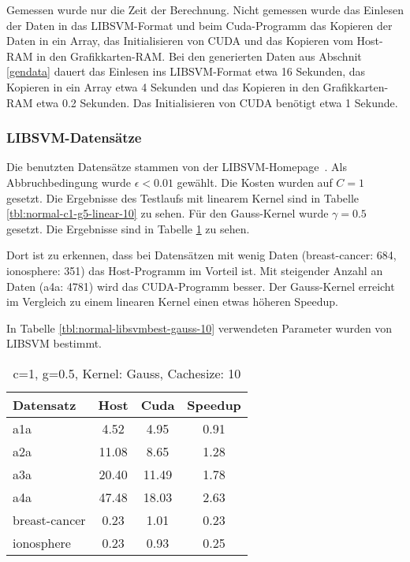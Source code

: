 \documentclass[ngerman]{scrartcl}
\begin{document}
Gemessen wurde nur die Zeit der Berechnung.
Nicht gemessen wurde das Einlesen der Daten in das LIBSVM-Format und beim Cuda-Programm das Kopieren der Daten 
in ein Array, das Initialisieren von CUDA und das Kopieren vom Host-RAM in den Grafikkarten-RAM.
Bei den generierten Daten aus Abschnit \ref{gendata} dauert das Einlesen ins LIBSVM-Format etwa 16 Sekunden, das Kopieren in ein Array
etwa 4 Sekunden und das Kopieren in den Grafikkarten-RAM etwa 0.2 Sekunden. Das Initialisieren von CUDA benötigt etwa 1 Sekunde.


\subsubsection{LIBSVM-Datensätze}
Die benutzten Datensätze stammen von der LIBSVM-Homepage~\cite{libsvm-data}. Als Abbruchbedingung wurde $\epsilon < 0.01$ gewählt. Die Kosten wurden auf $C=1$ gesetzt. Die Ergebnisse des Testlaufs mit linearem Kernel sind in Tabelle \ref{tbl:normal-c1-g5-linear-10} zu sehen. Für den Gauss-Kernel wurde $\gamma=0.5$ gesetzt. Die Ergebnisse sind in Tabelle \ref{tbl:normal-c1-g5-gauss-10} zu sehen.

Dort ist zu erkennen, dass bei Datensätzen mit wenig Daten (breast-cancer: 684, ionosphere: 351) das Host-Programm im Vorteil ist. Mit steigender Anzahl an Daten (a4a: 4781) wird das CUDA-Programm besser.
Der Gauss-Kernel erreicht im Vergleich zu einem linearen Kernel einen etwas höheren Speedup.

In Tabelle \ref{tbl:normal-libsvmbest-gauss-10} verwendeten Parameter wurden von LIBSVM bestimmt.

\begin{table}
\begin{center}
\begin{tabular}{|l|c|c|c|}
\hline
Datensatz & Host & Cuda & Speedup \\
\hline
a1a & 4.52 & 4.95 & 0.91 \\
a2a & 11.08 & 8.65 & 1.28 \\
a3a & 20.40 & 11.49 & 1.78 \\
a4a & 47.48 & 18.03 & 2.63 \\
breast-cancer & 0.23 & 1.01 & 0.23 \\
ionosphere & 0.23 & 0.93 & 0.25 \\
\hline
\end{tabular}
\end{center}
\caption{ c=1, g=0.5, Kernel: Gauss, Cachesize: 10}
\label{tbl:normal-c1-g5-gauss-10}
\end{table}
\end{document}
